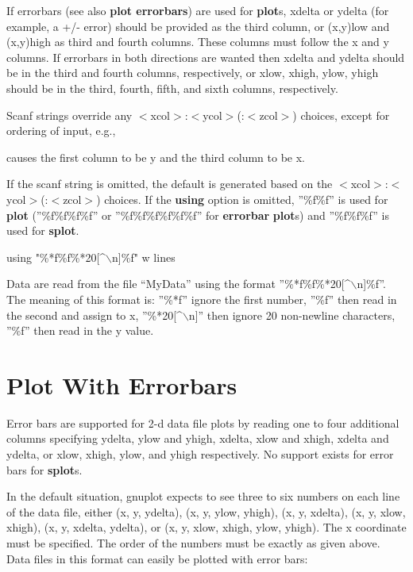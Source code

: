 If errorbars (see also {\bf plot errorbars}) are used for {\bf plot}s,
xdelta or ydelta (for example, a +/- error) should be provided as the
third column, or (x,y)low and (x,y)high as third and fourth columns.
These columns must follow the x and y columns. If errorbars in both
directions are wanted then xdelta and ydelta should be in the third
and fourth columns, respectively, or xlow, xhigh, ylow, yhigh should
be in the third, fourth, fifth, and sixth columns, respectively.

Scanf strings override any $<$xcol$>$:$<$ycol$>$(:$<$zcol$>$) choices,
except for ordering of input, e.g.,


causes the first column to be y and the third column to be x.

If the scanf string is omitted, the default is generated based on the
$<$xcol$>$:$<$ycol$>$(:$<$zcol$>$) choices. If the {\bf using} option
is omitted, ''\%f\%f'' is used for {\bf plot} (''\%f\%f\%f\%f'' or
''\%f\%f\%f\%f\%f\%f'' for {\bf errorbar} {\bf plot}s) and
''\%f\%f\%f'' is used for {\bf splot}.

 {using "\%*f\%f\%*20[^$\backslash$n]\%f" w lines}

Data are read from the file ``MyData'' using the format
''\%*f\%f\%*20[^$\backslash$n]\%f''. The meaning of this format is:
''\%*f'' ignore the first number, ''\%f'' then read in the second and
assign to x, ''\%*20[^$\backslash$n]'' then ignore 20 non-newline
characters, ''\%f'' then read in the y value.

\section{Plot With Errorbars}
Error bars are supported for 2-d data file plots by reading one to
four additional columns specifying ydelta, ylow and yhigh, xdelta,
xlow and xhigh, xdelta and ydelta, or xlow, xhigh, ylow, and yhigh
respectively. No support exists for error bars for {\bf splot}s.

In the default situation, gnuplot expects to see three to six
numbers on each line of the data file, either (x, y, ydelta),
(x, y, ylow, yhigh), (x, y, xdelta), (x, y, xlow, xhigh), 
(x, y, xdelta, ydelta), or (x, y, xlow, xhigh, ylow, yhigh). The x 
coordinate must be specified. The order of the numbers must be exactly 
as given above. Data files in this format can easily be plotted with error 
bars:


